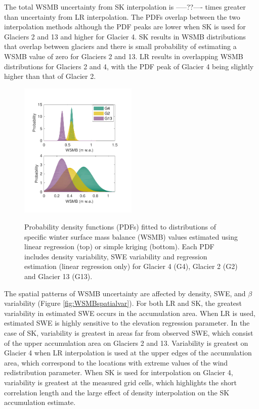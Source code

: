 \documentclass[twocolumn,letterpaper]{igs}
\begin{document}
The total WSMB uncertainty from SK interpolation is -----??---- times greater than uncertainty from LR interpolation. The PDFs overlap between the two interpolation methods although the PDF peaks are lower when SK is used for Glaciers 2 and 13 and higher for Glacier 4. SK results in WSMB distributions that overlap between glaciers and there is small probability of estimating a WSMB value of zero for Glaciers 2 and 13. LR results in overlapping WSMB distributions for Glaciers 2 and 4, with the PDF peak of Glacier 4 being slightly higher than that of Glacier 2. 

\begin{figure}
	\centering
	\includegraphics[width =0.5\textwidth]{WSMBDist_full.pdf}\\
	\caption{Probability density functions (PDFs) fitted to distributions of specific winter surface mass balance (WSMB) values estimated using linear regression (top) or simple kriging (bottom). Each PDF includes density variability, SWE variability and regression estimation (linear regression only) for Glacier 4 (G4), Glacier 2 (G2) and Glacier 13 (G13).}
	\label{fig:WSMBDist_LRvsSK}
\end{figure}


The spatial patterns of WSMB uncertainty are affected by density, SWE, and $\beta$ variability (Figure \ref{fig:WSMBspatialvar}).  For both LR and SK, the greatest variability in estimated SWE occurs in the accumulation area. When LR is used, estimated SWE is highly sensitive to the elevation regression parameter. In the case of SK, variability is greatest in areas far from observed SWE, which consist of the upper accumulation area on Glaciers 2 and 13. Variability is greatest on Glacier 4 when LR interpolation is used at the upper edges of the accumulation area, which correspond to the locations with extreme values of the wind redistribution parameter. When SK is used for interpolation on Glacier 4, variability is greatest at the measured grid cells, which highlights the short correlation length and the large effect of density interpolation on the SK accumulation estimate.
\end{document}
